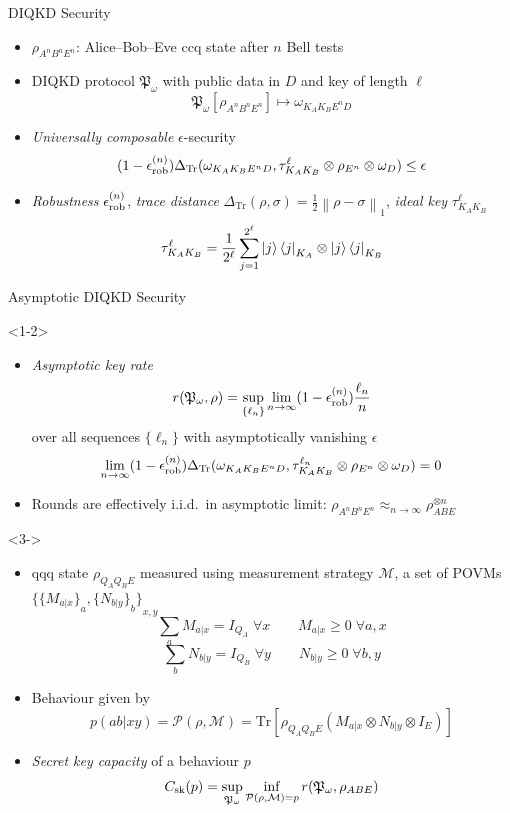 \documentclass[xcolor=dvipsnames]{beamer}
\newcommand{\?}{\mathrel{?}} %
\newcommand{\norm}[1]{\left\lVert#1\right\rVert} %
\newcommand{\Tr}{\mathrm{Tr}} %
\newcommand{\sM}{\mathcal{M}}
\newcommand{\cP}{\mathcal{P}}
\newcommand{\rob}{\rm rob}
\newcommand{\erob}[1]{\epsilon_{\rob}^{(#1)}}
\newcommand{\sk}{\rm sk}
\begin{document}
\begin{frame}{DIQKD Security}
  \begin{itemize}[<+->]
    \item \(\rho_{A^n B^n E^n}\): Alice--Bob--Eve ccq state after \(n\) Bell tests
    \item DIQKD protocol \(\mathfrak{P}_{\omega}\) with public data in \(D\) and key of length \(\ell\)
      \[ \mathfrak{P}_{\omega}\left[\rho_{A^n B^n E^n}\right] \mapsto \omega_{K_A K_B E^n D} \]
    \item \emph{Universally composable} \(\epsilon\)-security
      \[ (1-\erob{n})\Delta_{\Tr}(\omega_{K_A K_B E^n D}, \tau_{K_A K_B}^{\ell} \otimes \rho_{E^n} \otimes \omega_D) \leq \epsilon \]
    \item \emph{Robustness} \(\erob{n}\), \emph{trace distance} \(\Delta_{\Tr}(\rho, \sigma) = \frac{1}{2}\norm{\rho - \sigma}_1\), \emph{ideal key} \(\tau_{K_A K_B}^{\ell}\)
      \[ \tau_{K_A K_B}^{\ell} = \frac{1}{2^{\ell}} \sum_{j=1}^{2^{\ell}} \ket{j}\bra{j}_{K_A} \otimes \ket{j}\bra{j}_{K_B} \]
  \end{itemize}
\end{frame}

\begin{frame}{Asymptotic DIQKD Security}
  \begin{onlyenv}<1-2>
    \begin{itemize}[<+->]
    \item \emph{Asymptotic key rate}
      \[ r(\mathfrak{P}_{\omega}, \rho) = \sup_{\{\ell_n\}} \lim_{n\to\infty} (1-\erob{n}) \frac{\ell_n}{n} \]
      over all sequences \(\{\ell_n\}\) with asymptotically vanishing \(\epsilon\)
    \[ \lim_{n\to\infty} (1-\erob{n})\Delta_{\Tr}(\omega_{K_A K_B E^n D}, \tau_{K_A K_B}^{\ell_n} \otimes \rho_{E^n} \otimes \omega_{D}) = 0 \]
    \item Rounds are effectively i.i.d.\ in asymptotic limit: \(\rho_{A^n B^n E^n} \approx_{n\to\infty} \rho_{ABE}^{\otimes n}\)
  \end{itemize}
  \end{onlyenv}
  \begin{onlyenv}<3->
    \begin{itemize}[<+->]
    \item qqq state \(\rho_{Q_A Q_B E}\) measured using measurement strategy \(\sM\), a set of POVMs \({\{{\{M_{a|x}\}}_{a}, {\{N_{b|y}\}}_{b}\}}_{x,y}\)
    \[ \sum_{a} M_{a|x} = I_{Q_A}\;\forall x \qquad M_{a|x} \geq 0\;\forall a, x \]
    \[ \sum_{b} N_{b|y} = I_{Q_B}\;\forall y \qquad N_{b|y} \geq 0\;\forall b, y \]
  \item Behaviour given by
      \[ p(ab|xy) = \cP(\rho, \sM) = \Tr\left[\rho_{Q_A Q_B E} \left(M_{a|x} \otimes N_{b|y} \otimes I_{E}\right) \right] \]
    \item \emph{Secret key capacity} of a behaviour \(p\)
      \[ C_{\sk}(p) = \sup_{\mathfrak{P}_{\omega}} \inf_{ \substack{
            \cP(\rho, \sM) = p
        }
      } r(\mathfrak{P}_{\omega}, \rho_{ABE}) \]
  \end{itemize}
  \end{onlyenv}
\end{frame}
\end{document}
